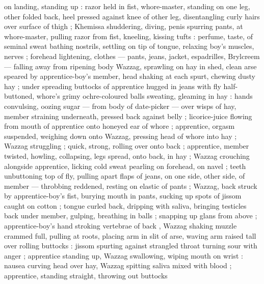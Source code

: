 on landing, standing up : razor held in fist, whore-master, standing on one leg, other folded back, heel pressed against knee of other leg, disentangling curly hairs over surface of thigh ; Khemissa shuddering, diving, penis spurring pants, at whore-master, pulling razor from fist, kneeling, kissing tufts : perfume, taste, of seminal sweat bathing nostrils, settling on tip of tongue, relaxing boy's muscles, nerves ; forehead lightening, clothes --- pants, jeans, jacket, espadrilles, Brylcreem --- falling away from ripening body {\semislash} Wazzag, sprawling on hay in shed, clean arse speared by apprentice-boy's member, head shaking at each spurt, chewing dusty hay ; under spreading buttocks of apprentice hugged in jeans with fly half-buttoned, whore's grimy ochre-coloured balls sweating, gleaming in hay : hands convulsing, oozing sugar --- from body of date-picker --- over wisps of hay, member straining underneath, pressed back against belly ; licorice-juice flowing from mouth of apprentice onto honeyed ear of whore ; apprentice, orgasm suspended, weighing down onto Wazzag, pressing head of whore into hay ; Wazzag struggling ; quick, strong, rolling over onto back ; apprentice, member twisted, howling, collapsing, legs spread, onto back, in hay ; Wazzag crouching alongside apprentice, licking cold sweat pearling on forehead, on navel ; teeth unbuttoning top of fly, pulling apart flaps of jeans, on one side, other side, of member --- throbbing reddened, resting on elastic of pants ; Wazzag, back struck by apprentice-boy's fist, burying mouth in pants, sucking up spots of jissom caught on cotton ; tongue curled back, dripping with saliva, bringing testicles back under member, gulping, breathing in balls ; snapping up glans from above ; apprentice-boy's hand stroking vertebrae of back{\td} , Wazzag shaking muzzle crammed full, pulling at roots, placing arm in slit of arse, waving arm raised tall over rolling buttocks : jissom spurting against strangled throat turning sour with anger ; apprentice standing up, Wazzag swallowing, wiping mouth on wrist : nausea curving head over hay, Wazzag spitting saliva mixed with blood ; apprentice, standing straight, throwing out buttocks{\td} 

